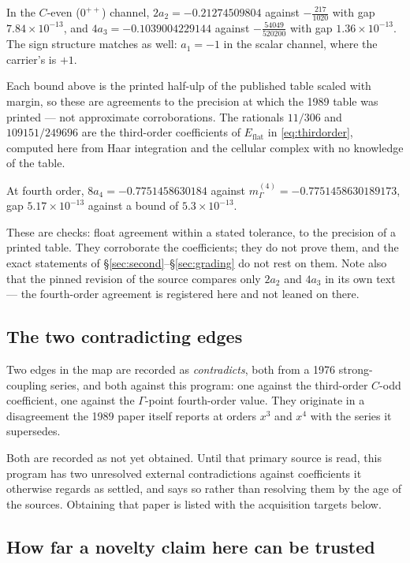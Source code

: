 \noindent In the $C$-even ($0^{++}$) channel, $2a_2 = -0.21274509804$
against $-\tfrac{217}{1020}$ with gap $7.84\times10^{-13}$, and
$4a_3 = -0.1039004229144$ against $-\tfrac{54049}{520200}$ with gap
$1.36\times10^{-13}$. The sign structure matches as well: $a_1 = -1$ in
the scalar channel, where the carrier's is $+1$.

Each bound above is the printed half-ulp of the published table scaled
with margin, so these are agreements to the precision at which the 1989
table was printed --- not approximate corroborations. The rationals
$11/306$ and $109151/249696$ are the third-order coefficients of
$E_{\mathrm{flat}}$ in \eqref{eq:thirdorder}, computed here from Haar
integration and the cellular complex with no knowledge of the table.

At fourth order, $8a_4 = -0.7751458630184$ against
$m^{(4)}_{\Gamma} = -0.7751458630189173$, gap $5.17\times10^{-13}$
against a bound of $5.3\times10^{-13}$.

\begin{scopenote}
These are \Ttwo{} checks: float agreement within a stated tolerance, to
the precision of a printed table. They corroborate the coefficients;
they do not prove them, and the exact statements of
\S\ref{sec:second}--\S\ref{sec:grading} do not rest on them. Note also
that the pinned revision of the source compares only $2a_2$ and $4a_3$
in its own text --- the fourth-order agreement is registered here and
not leaned on there.
\end{scopenote}

\subsection{The two contradicting edges}

Two edges in the map are recorded as \emph{contradicts}, both from a
1976 strong-coupling series, and both against this program: one against
the third-order $C$-odd coefficient, one against the $\Gamma$-point
fourth-order value. They originate in a disagreement the 1989 paper
itself reports at orders $x^3$ and $x^4$ with the series it supersedes.

Both are recorded as not yet obtained. Until that primary source is
read, this program has two unresolved external contradictions against
coefficients it otherwise regards as settled, and says so rather than
resolving them by the age of the sources. Obtaining that paper is
listed with the acquisition targets below.

\subsection{How far a novelty claim here can be trusted}

